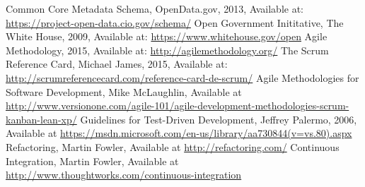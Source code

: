 \begin{thebibliography}{1}
    Common Core Metadata Schema, OpenData.gov, 2013, Available at: \url{https://project-open-data.cio.gov/schema/}
    Open Government Inititative, The White House, 2009, Available at: \url{https://www.whitehouse.gov/open}
    Agile Methodology, 2015, Available at: \url{http://agilemethodology.org/}
    The Scrum Reference Card, Michael James, 2015, Available at: \url{http://scrumreferencecard.com/reference-card-de-scrum/}
    Agile Methodologies for Software Development, Mike McLaughlin, Available at \url{http://www.versionone.com/agile-101/agile-development-methodologies-scrum-kanban-lean-xp/}
    Guidelines for Test-Driven Development, Jeffrey Palermo, 2006, Available at \url{https://msdn.microsoft.com/en-us/library/aa730844(v=vs.80).aspx}
    Refactoring, Martin Fowler, Available at \url{http://refactoring.com/}
    Continuous Integration, Martin Fowler, Available at \url{http://www.thoughtworks.com/continuous-integration}
\end{thebibliography}

